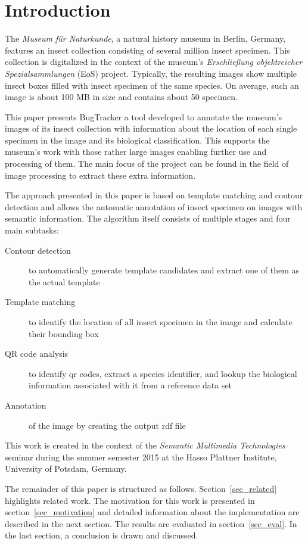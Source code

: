 \section{Introduction}
\label{sec_introduction}

The \emph{Museum für Naturkunde}, a natural history museum in Berlin, Germany, features an insect collection consisting of several million insect specimen.
This collection is digitalized in the context of the museum's \emph{Erschließung objektreicher Spezialsammlungen} (EoS) project.
Typically, the resulting images show multiple insect boxes filled with insect specimen of the same species.
On average, such an image is about 100 MB in size and contains about 50 specimen.

This paper presents BugTracker \textendash{} a tool developed to annotate the museum's images of its insect collection with information about the location of each single specimen in the image and its biological classification.
This supports the museum's work with those rather large images enabling further use and processing of them.
The main focus of the project can be found in the field of image processing to extract these extra information.

The approach presented in this paper is based on template matching and contour detection and allows the automatic annotation of insect specimen on images with semantic information.
The algorithm itself consists of multiple stages and four main subtasks:

\begin{description}
    \item[Contour detection] to automatically generate template candidates and extract one of them as the actual template
    \item[Template matching] to identify the location of all insect specimen in the image and calculate their bounding box
    \item[QR code analysis] to identify qr codes, extract a species identifier, and lookup the biological information associated with it from a reference data set
    \item[Annotation] of the image by creating the output rdf file
\end{description}

This work is created in the context of the \emph{Semantic Multimedia Technologies} seminar during the summer semester 2015 at the Hasso Plattner Institute, University of Potsdam, Germany.

The remainder of this paper is structured as follows. 
Section~\ref{sec_related} highlights related work.
The motivation for this work is presented in section~\ref{sec_motivation} and detailed information about the implementation are described in the next section.
The results are evaluated in section~\ref{sec_eval}.
In the last section, a conclusion is drawn and discussed.
